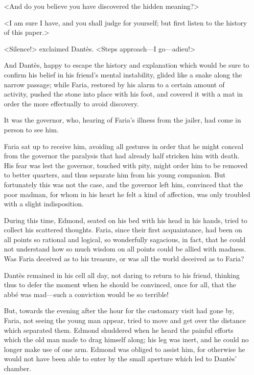  <And do you believe you have discovered the hidden meaning?> 

 <I am sure I have, and you shall judge for yourself; but first listen to the history of this paper.> 

 <Silence!> exclaimed Dantès. <Steps approach—I go—adieu!> 

 And Dantès, happy to escape the history and explanation which would be sure to confirm his belief in his friend's mental instability, glided like a snake along the narrow passage; while Faria, restored by his alarm to a certain amount of activity, pushed the stone into place with his foot, and covered it with a mat in order the more effectually to avoid discovery. 

 It was the governor, who, hearing of Faria's illness from the jailer, had come in person to see him. 

 Faria sat up to receive him, avoiding all gestures in order that he might conceal from the governor the paralysis that had already half stricken him with death. His fear was lest the governor, touched with pity, might order him to be removed to better quarters, and thus separate him from his young companion. But fortunately this was not the case, and the governor left him, convinced that the poor madman, for whom in his heart he felt a kind of affection, was only troubled with a slight indisposition. 

 During this time, Edmond, seated on his bed with his head in his hands, tried to collect his scattered thoughts. Faria, since their first acquaintance, had been on all points so rational and logical, so wonderfully sagacious, in fact, that he could not understand how so much wisdom on all points could be allied with madness. Was Faria deceived as to his treasure, or was all the world deceived as to Faria? 

 Dantès remained in his cell all day, not daring to return to his friend, thinking thus to defer the moment when he should be convinced, once for all, that the abbé was mad—such a conviction would be so terrible! 

 But, towards the evening after the hour for the customary visit had gone by, Faria, not seeing the young man appear, tried to move and get over the distance which separated them. Edmond shuddered when he heard the painful efforts which the old man made to drag himself along; his leg was inert, and he could no longer make use of one arm. Edmond was obliged to assist him, for otherwise he would not have been able to enter by the small aperture which led to Dantès' chamber. 

